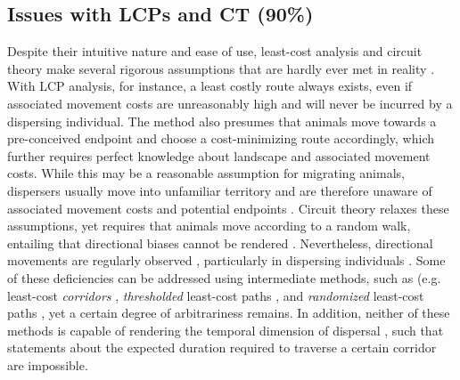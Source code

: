 \documentclass[abstract=on,10pt,a4paper,bibliography=totocnumbered]{article}
\begin{document}
\subsection{Issues with LCPs and CT (90\%)}
Despite their intuitive nature and ease of use, least-cost analysis and circuit
theory make several rigorous assumptions that are hardly ever met in reality
\citep{Diniz.2020}. With LCP analysis, for instance, a least costly route always
exists, even if associated movement costs are unreasonably high and will never
be incurred by a dispersing individual. The method also presumes that animals
move towards a pre-conceived endpoint and choose a cost-minimizing route
accordingly, which further requires perfect knowledge about landscape and
associated movement costs. While this may be a reasonable assumption for
migrating animals, dispersers usually move into unfamiliar territory and are
therefore unaware of associated movement costs and potential endpoints
\citep{Koen.2014, Abrahms.2017, Cozzi.2020}. Circuit theory relaxes these
assumptions, yet requires that animals move according to a random walk,
entailing that directional biases cannot be rendered \citep{Diniz.2020}.
Nevertheless, directional movements are regularly observed \citep{Bovet.1991,
Schultz.2001}, particularly in dispersing individuals \citep{Cozzi.2020,
Hofmann.2021}. Some of these deficiencies can be addressed using intermediate
methods, such as (e.g. least-cost \textit{corridors} \citep{Pinto.2009},
\textit{thresholded} least-cost paths \citep{Landguth.2012}, and
\textit{randomized} least-cost paths \citep{Panzacchi.2016}, yet a certain
degree of arbitrariness remains. In addition, neither of these methods is
capable of rendering the temporal dimension of dispersal \citep{Diniz.2020},
such that statements about the expected duration required to traverse a certain
corridor are impossible.

\end{document}
